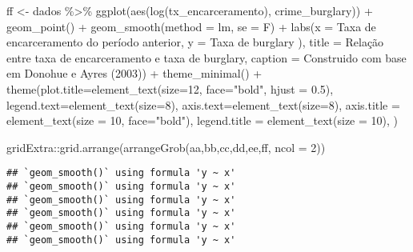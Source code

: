 \documentclass[
]{article}
\newenvironment{Shaded}{\begin{snugshade}}{\end{snugshade}}
\newcommand{\AttributeTok}[1]{\textcolor[rgb]{0.77,0.63,0.00}{#1}}
\newcommand{\DecValTok}[1]{\textcolor[rgb]{0.00,0.00,0.81}{#1}}
\newcommand{\FloatTok}[1]{\textcolor[rgb]{0.00,0.00,0.81}{#1}}
\newcommand{\FunctionTok}[1]{\textcolor[rgb]{0.00,0.00,0.00}{#1}}
\newcommand{\NormalTok}[1]{#1}
\newcommand{\OtherTok}[1]{\textcolor[rgb]{0.56,0.35,0.01}{#1}}
\newcommand{\SpecialCharTok}[1]{\textcolor[rgb]{0.00,0.00,0.00}{#1}}
\newcommand{\StringTok}[1]{\textcolor[rgb]{0.31,0.60,0.02}{#1}}
\begin{document}
\begin{Shaded}
\begin{Highlighting}[]
\NormalTok{ff }\OtherTok{\textless{}{-}}\NormalTok{ dados }\SpecialCharTok{\%\textgreater{}\%} 
  \FunctionTok{ggplot}\NormalTok{(}\FunctionTok{aes}\NormalTok{(}\FunctionTok{log}\NormalTok{(tx\_encarceramento), crime\_burglary)) }\SpecialCharTok{+}
  \FunctionTok{geom\_point}\NormalTok{() }\SpecialCharTok{+} 
  \FunctionTok{geom\_smooth}\NormalTok{(}\AttributeTok{method =} \StringTok{\textquotesingle{}lm\textquotesingle{}}\NormalTok{, }\AttributeTok{se =}\NormalTok{ F) }\SpecialCharTok{+}
  \FunctionTok{labs}\NormalTok{(}\AttributeTok{x =} \StringTok{\textquotesingle{}Taxa de encarceramento do período anterior\textquotesingle{}}\NormalTok{,}
       \AttributeTok{y =} \StringTok{\textquotesingle{}Taxa de burglary )\textquotesingle{}}\NormalTok{,}
       \AttributeTok{title =} \StringTok{\textquotesingle{}Relação entre taxa de encarceramento e taxa de burglary\textquotesingle{}}\NormalTok{,}
       \AttributeTok{caption =} \StringTok{\textquotesingle{}Construido com base em Donohue e Ayres (2003)\textquotesingle{}}\NormalTok{) }\SpecialCharTok{+} 
  \FunctionTok{theme\_minimal}\NormalTok{() }\SpecialCharTok{+}
  \FunctionTok{theme}\NormalTok{(}\AttributeTok{plot.title=}\FunctionTok{element\_text}\NormalTok{(}\AttributeTok{size=}\DecValTok{12}\NormalTok{, }\AttributeTok{face=}\StringTok{"bold"}\NormalTok{, }\AttributeTok{hjust =} \FloatTok{0.5}\NormalTok{),}
        \AttributeTok{legend.text=}\FunctionTok{element\_text}\NormalTok{(}\AttributeTok{size=}\DecValTok{8}\NormalTok{),}
        \AttributeTok{axis.text=}\FunctionTok{element\_text}\NormalTok{(}\AttributeTok{size=}\DecValTok{8}\NormalTok{),}
        \AttributeTok{axis.title =} \FunctionTok{element\_text}\NormalTok{(}\AttributeTok{size =} \DecValTok{10}\NormalTok{, }\AttributeTok{face=}\StringTok{"bold"}\NormalTok{),}
        \AttributeTok{legend.title =} \FunctionTok{element\_text}\NormalTok{(}\AttributeTok{size =} \DecValTok{10}\NormalTok{),}
\NormalTok{  )}

\NormalTok{gridExtra}\SpecialCharTok{::}\FunctionTok{grid.arrange}\NormalTok{(}\FunctionTok{arrangeGrob}\NormalTok{(aa,bb,cc,dd,ee,ff, }\AttributeTok{ncol =} \DecValTok{2}\NormalTok{))}
\end{Highlighting}
\end{Shaded}

\begin{verbatim}
## `geom_smooth()` using formula 'y ~ x'
## `geom_smooth()` using formula 'y ~ x'
## `geom_smooth()` using formula 'y ~ x'
## `geom_smooth()` using formula 'y ~ x'
## `geom_smooth()` using formula 'y ~ x'
## `geom_smooth()` using formula 'y ~ x'
\end{verbatim}
\end{document}
